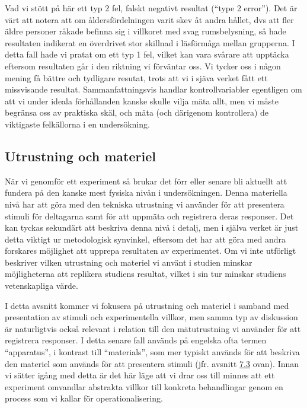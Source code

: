\documentclass[
]{book}
\begin{document}
Vad vi stött på här ett typ 2 fel, falskt negativt resultat (``type 2 error''). Det är värt att notera att om åldersfördelningen varit skev åt andra hållet, dvs att fler äldre personer råkade befinna sig i villkoret med svag rumsbelysning, så hade resultaten indikerat en överdrivet stor skillnad i läsförmåga mellan grupperna. I detta fall hade vi pratat om ett typ 1 fel, vilket kan vara svårare att upptäcka eftersom resultaten går i den riktning vi förväntar oss. Vi tycker oss i någon mening få bättre och tydligare resutat, trots att vi i sjäva verket fått ett missvisande resultat. Sammanfattningsvis handlar kontrollvariabler egentligen om att vi under ideala förhållanden kanske skulle vilja mäta allt, men vi måste begränsa oss av praktiska skäl, och mäta (och därigenom kontrollera) de viktigaste felkällorna i en undersökning.

\hypertarget{sub07.4.5}{%
\subsection{Utrustning och materiel}\label{sub07.4.5}}

När vi genomför ett experiment så brukar det förr eller senare bli aktuellt att fundera på den kanske mest fysiska nivån i undersökningen. Denna materiella nivå har att göra med den tekniska utrustning vi använder för att presentera stimuli för deltagarna samt för att uppmäta och registrera deras responser. Det kan tyckas sekundärt att beskriva denna nivå i detalj, men i själva verket är just detta viktigt ur metodologisk synvinkel, eftersom det har att göra med andra forskares möjlighet att upprepa resultaten av experimentet. Om vi inte utförligt beskriver vilken utrustning och materiel vi använt i studien minskar möjligheterna att replikera studiens resultat, vilket i sin tur minskar studiens vetenskapliga värde.

I detta avsnitt kommer vi fokusera på utrustning och materiel i samband med presentation av stimuli och experimentella villkor, men samma typ av diskussion är naturligtvis också relevant i relation till den mätutrustning vi använder för att registrera responser. I detta senare fall används på engelska ofta termen ``apparatus'', i kontrast till ``materials'', som mer typiskt används för att beskriva den materiel som används för att presentera stimuli (jfr. avsnitt \protect\hyperlink{sec07.3}{7.3} ovan). Innan vi sätter igång med detta är det här läge att vi drar oss till minnes att ett experiment omvandlar abstrakta villkor till konkreta behandlingar genom en process som vi kallar för operationalisering.
\end{document}
